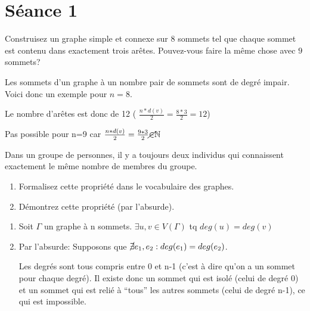 
\section{Séance 1}

\begin{exo}
Construisez un graphe simple et connexe sur $8$ sommets tel que chaque sommet est contenu dans exactement trois ar\^etes. Pouvez-vous faire la m\^eme chose avec $9$ sommets?
\end{exo}

Les sommets d'un graphe à un nombre pair de sommets sont de degré impair. Voici donc un exemple pour $n=8$.

\begin{figure}[!h]
\centering
\scalebox{.825}{}
\end{figure}

Le nombre d'arêtes est donc de 12 ( $ \frac{n*d(v)}{2} = \frac{8*3}{2} = 12$) 

Pas possible pour n=9 car $ \frac{n*d(v)}{2} = \frac{9*3}{2} \cancel{\in} \mathbb{N} $


\begin{exo}
Dans un groupe de personnes, il y a toujours deux individus qui connaissent exactement le m\^eme nombre de membres du groupe.
\begin{enumerate}
\item Formalisez cette propri\'et\'e dans le vocabulaire des graphes.
\item D\'emontrez cette propri\'et\'e (par l'absurde).
\end{enumerate}
\end{exo}

\begin{enumerate}
\item Soit $\Gamma$ un graphe à n sommets. $\exists u,v \in V(\Gamma)$ tq $deg(u)=deg(v)$
\item Par l'absurde: Supposons que $\cancel{\exists}{} e_{1}, e_{2}: deg(e_{1}) = deg(e_{2})$. 

Les degrés sont tous compris entre 0 et n-1 (c'est à dire qu'on a un sommet pour chaque degré). Il existe donc un sommet qui est isolé (celui de degré 0) et un sommet qui est relié à ``tous'' les autres sommets (celui de degré n-1), ce qui est impossible.
\end{enumerate}


